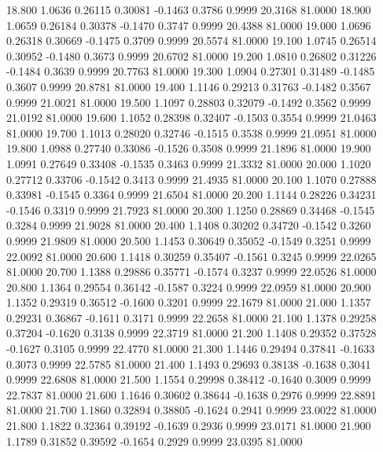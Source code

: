   18.800   1.0636   0.26115   0.30081  -0.1463   0.3786   0.9999  20.3168  81.0000
  18.900   1.0659   0.26184   0.30378  -0.1470   0.3747   0.9999  20.4388  81.0000
  19.000   1.0696   0.26318   0.30669  -0.1475   0.3709   0.9999  20.5574  81.0000
  19.100   1.0745   0.26514   0.30952  -0.1480   0.3673   0.9999  20.6702  81.0000
  19.200   1.0810   0.26802   0.31226  -0.1484   0.3639   0.9999  20.7763  81.0000
  19.300   1.0904   0.27301   0.31489  -0.1485   0.3607   0.9999  20.8781  81.0000
  19.400   1.1146   0.29213   0.31763  -0.1482   0.3567   0.9999  21.0021  81.0000
  19.500   1.1097   0.28803   0.32079  -0.1492   0.3562   0.9999  21.0192  81.0000
  19.600   1.1052   0.28398   0.32407  -0.1503   0.3554   0.9999  21.0463  81.0000
  19.700   1.1013   0.28020   0.32746  -0.1515   0.3538   0.9999  21.0951  81.0000
  19.800   1.0988   0.27740   0.33086  -0.1526   0.3508   0.9999  21.1896  81.0000
  19.900   1.0991   0.27649   0.33408  -0.1535   0.3463   0.9999  21.3332  81.0000
  20.000   1.1020   0.27712   0.33706  -0.1542   0.3413   0.9999  21.4935  81.0000
  20.100   1.1070   0.27888   0.33981  -0.1545   0.3364   0.9999  21.6504  81.0000
  20.200   1.1144   0.28226   0.34231  -0.1546   0.3319   0.9999  21.7923  81.0000
  20.300   1.1250   0.28869   0.34468  -0.1545   0.3284   0.9999  21.9028  81.0000
  20.400   1.1408   0.30202   0.34720  -0.1542   0.3260   0.9999  21.9809  81.0000
  20.500   1.1453   0.30649   0.35052  -0.1549   0.3251   0.9999  22.0092  81.0000
  20.600   1.1418   0.30259   0.35407  -0.1561   0.3245   0.9999  22.0265  81.0000
  20.700   1.1388   0.29886   0.35771  -0.1574   0.3237   0.9999  22.0526  81.0000
  20.800   1.1364   0.29554   0.36142  -0.1587   0.3224   0.9999  22.0959  81.0000
  20.900   1.1352   0.29319   0.36512  -0.1600   0.3201   0.9999  22.1679  81.0000
  21.000   1.1357   0.29231   0.36867  -0.1611   0.3171   0.9999  22.2658  81.0000
  21.100   1.1378   0.29258   0.37204  -0.1620   0.3138   0.9999  22.3719  81.0000
  21.200   1.1408   0.29352   0.37528  -0.1627   0.3105   0.9999  22.4770  81.0000
  21.300   1.1446   0.29494   0.37841  -0.1633   0.3073   0.9999  22.5785  81.0000
  21.400   1.1493   0.29693   0.38138  -0.1638   0.3041   0.9999  22.6808  81.0000
  21.500   1.1554   0.29998   0.38412  -0.1640   0.3009   0.9999  22.7837  81.0000
  21.600   1.1646   0.30602   0.38644  -0.1638   0.2976   0.9999  22.8891  81.0000
  21.700   1.1860   0.32894   0.38805  -0.1624   0.2941   0.9999  23.0022  81.0000
  21.800   1.1822   0.32364   0.39192  -0.1639   0.2936   0.9999  23.0171  81.0000
  21.900   1.1789   0.31852   0.39592  -0.1654   0.2929   0.9999  23.0395  81.0000
